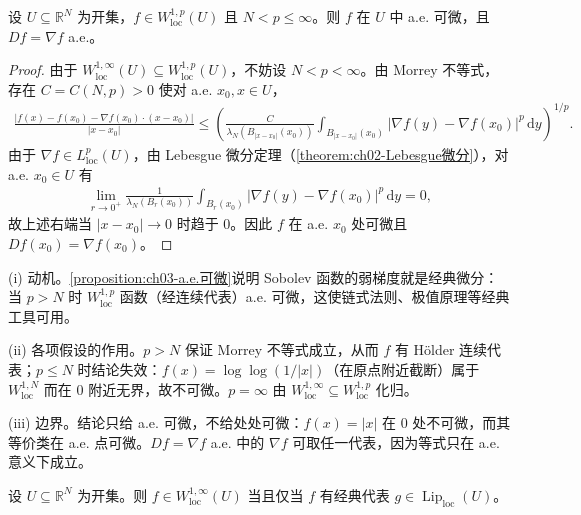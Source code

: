 \documentclass[../../main.tex]{subfiles}%
\begin{document}
\begin{proposition}\label{proposition:ch03-a.e.可微}
设 $U\subseteq\mathbb{R}^N$ 为开集，$f\in W^{1,p}_{\mathrm{loc}}(U)$ 且 $N<p\leqslant\infty$。则 $f$ 在 $U$ 中 a.e. 可微，且 $Df=\nabla f$ a.e.。
\end{proposition}

\begin{proof}
由于 $W^{1,\infty}_{\mathrm{loc}}(U)\subseteq W^{1,p}_{\mathrm{loc}}(U)$，不妨设 $N<p<\infty$。由 Morrey 不等式，存在 $C=C(N,p)>0$ 使对 a.e. $x_0,x\in U$，
\begin{align*}
\frac{|f(x)-f(x_0)-\nabla f(x_0)\cdot(x-x_0)|}{|x-x_0|}
\leqslant\left(\frac{C}{\lambda_N(B_{|x-x_0|}(x_0))}\int_{B_{|x-x_0|}(x_0)}|\nabla f(y)-\nabla f(x_0)|^p\,\mathrm{d}y\right)^{1/p}.
\end{align*}
由于 $\nabla f\in L^p_{\mathrm{loc}}(U)$，由 Lebesgue 微分定理（\cref{theorem:ch02-Lebesgue微分}），对 a.e. $x_0\in U$ 有
\begin{align*}
\lim_{r\to0^+}\frac{1}{\lambda_N(B_r(x_0))}\int_{B_r(x_0)}|\nabla f(y)-\nabla f(x_0)|^p\,\mathrm{d}y=0,
\end{align*}
故上述右端当 $|x-x_0|\to0$ 时趋于 $0$。因此 $f$ 在 a.e. $x_0$ 处可微且 $Df(x_0)=\nabla f(x_0)$。
\end{proof}

\begin{remark}\label{remark:ch03-a.e.可微动机}
(i) 动机。\cref{proposition:ch03-a.e.可微}说明 Sobolev 函数的弱梯度就是经典微分：当 $p>N$ 时 $W^{1,p}_{\mathrm{loc}}$ 函数（经连续代表）a.e. 可微，这使链式法则、极值原理等经典工具可用。

(ii) 各项假设的作用。$p>N$ 保证 Morrey 不等式成立，从而 $f$ 有 Hölder 连续代表；$p\leqslant N$ 时结论失效：$f(x)=\log\log(1/|x|)$（在原点附近截断）属于 $W^{1,N}_{\mathrm{loc}}$ 而在 $0$ 附近无界，故不可微。$p=\infty$ 由 $W^{1,\infty}_{\mathrm{loc}}\subseteq W^{1,p}_{\mathrm{loc}}$ 化归。

(iii) 边界。结论只给 a.e. 可微，不给处处可微：$f(x)=|x|$ 在 $0$ 处不可微，而其等价类在 a.e. 点可微。$Df=\nabla f$ a.e. 中的 $\nabla f$ 可取任一代表，因为等式只在 a.e. 意义下成立。
\end{remark}

\begin{theorem}\label{theorem:ch03-W1infty=Lip}
设 $U\subseteq\mathbb{R}^N$ 为开集。则 $f\in W^{1,\infty}_{\mathrm{loc}}(U)$ 当且仅当 $f$ 有经典代表 $g\in\operatorname{Lip}_{\mathrm{loc}}(U)$。
\end{theorem}
\end{document}
